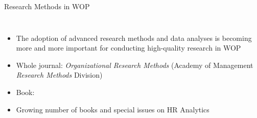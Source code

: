 \documentclass{beamer}
\begin{document}
\begin{frame}{Research Methods in WOP}
    \begin{columns}[t] %
        
        \begin{itemize}
            \item The adoption of advanced research methods and data analyses is becoming more and more important for conducting high-quality research in WOP
            
            \item Whole journal: \textit{Organizational Research Methods} {\scriptsize (Academy of Management \textemdash  \textit{Research Methods} Division)}
            
            \item Book: \textcite{landers2024}
            
            \item Growing number of books and special issues on HR Analytics
            \scriptsize \parencite[]{bauer2024HR, caughlin2024r, edwards2024hr, khan_milner2023, mcnulty2022handbook, starbuck2023fundamentals}    
        \end{itemize}


\end{columns}
\end{frame}
\end{document}
